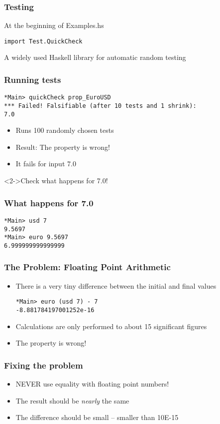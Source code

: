\documentclass{beamer}
\begin{document}
\begin{frame}[fragile]
  \frametitle{Testing}
  \begin{block}{At the beginning of Examples.hs}
\begin{verbatim}
import Test.QuickCheck
\end{verbatim}
    A widely used Haskell library for automatic random testing
  \end{block}
\end{frame}
\begin{frame}[fragile]
  \frametitle{Running tests}
\begin{verbatim}
*Main> quickCheck prop_EuroUSD
*** Failed! Falsifiable (after 10 tests and 1 shrink): 
7.0
\end{verbatim}
  \begin{itemize}
  \item Runs 100 randomly chosen tests
  \item Result: The property is wrong!
  \item It fails for input 7.0
  \end{itemize}
  \begin{alertblock}<2->{Check what happens for 7.0!}
    
  \end{alertblock}
\end{frame}
\begin{frame}[fragile]
  \frametitle{What happens for 7.0}
\begin{verbatim}
*Main> usd 7
9.5697
*Main> euro 9.5697
6.999999999999999
\end{verbatim}
\end{frame}
\begin{frame}[fragile]
  \frametitle{The Problem: Floating Point Arithmetic}
  \begin{itemize}
  \item  There is a very tiny difference between the initial and final values 
\begin{verbatim}
*Main> euro (usd 7) - 7
-8.881784197001252e-16
\end{verbatim}
  \item Calculations are only performed to about 15 significant
    figures 
  \item  The property is wrong! 
  \end{itemize}
\end{frame}
\begin{frame}
  \frametitle{Fixing the problem}
  \begin{itemize}
  \item NEVER use equality with floating point numbers!
  \item  The result should be \emph{nearly} the same 
  \item  The difference should be small – smaller than 10E-15
  \end{itemize}
\end{frame}
\end{document}
